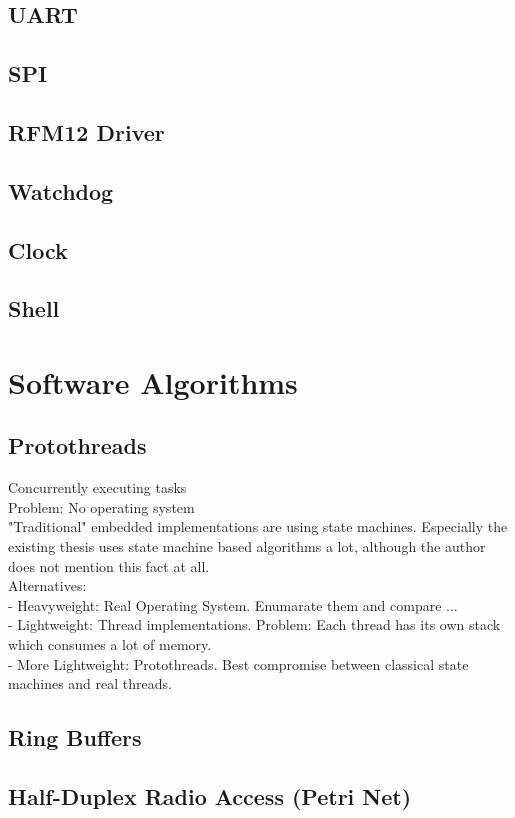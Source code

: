 \section{UART}
\section{SPI}
\section{RFM12 Driver}
\section{Watchdog}
\section{Clock}
\section{Shell}

\chapter{Software Algorithms}
\section{Protothreads}
Concurrently executing tasks \\
Problem: No operating system \\
"Traditional" embedded implementations are using state machines. Especially the existing thesis uses state machine based algorithms a lot, although the author does not mention this fact at all. \\

Alternatives: \\
- Heavyweight: Real Operating System. Enumarate them and compare ... \\
- Lightweight: Thread implementations. Problem: Each thread has its own stack which consumes a lot of memory. \\
- More Lightweight: Protothreads. Best compromise between classical state machines and real threads. \\

\section{Ring Buffers}
\section{Half-Duplex Radio Access (Petri Net)}

